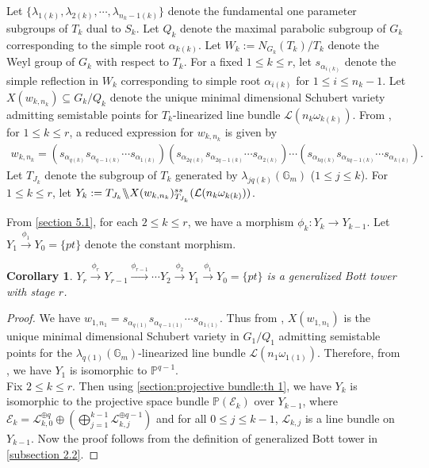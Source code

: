 \documentclass[12pt,reqno]{amsart}
\numberwithin{equation}{section}
\newtheorem{corollary}[theorem]{Corollary}
\theoremstyle{definition}
\newcommand{\GmodX}[3]{#1 \backslash\mkern-6mu\backslash #2^{ss}_{#1}(#3)}
\begin{document}
	Let $\{\lambda_{1(k)},\lambda_{2(k)},\cdots,\lambda_{n_{k}-1(k)}\}$ denote the fundamental one parameter subgroups of $T_{k}$ dual to $S_{k}$. Let $Q_{k}$ denote the maximal parabolic subgroup of $G_{k}$ corresponding to the simple root $\alpha_{k(k)}$. Let $W_{k}:=N_{G_{k}}(T_{k})/T_{k}$ denote the Weyl group of $G_{k}$ with respect to $T_{k}$. For a fixed  $1\leq k\leq r$, let $s_{\alpha_{i(k)}}$ denote the simple reflection in $W_{k}$ corresponding to simple root $\alpha_{i(k)}$ for $1\leq i\leq n_{k}-1$. Let $X(w_{k,n_{k}})\subseteq G_{k}/Q_{k}$ denote the  unique minimal dimensional Schubert variety admitting semistable points for $T_{k}$-linearized line bundle $\mathcal{L}(n_{k}\omega_{k(k)})$. From \cite[Lemma 2.7]{sskannan}, for $1\leq k\leq r$, a reduced expression for $w_{k,n_{k}}$ is given by 
	\begin{align*}
		w_{k,n_{k}}=(s_{\alpha_{q(k)}}s_{\alpha_{q-1(k)}}\cdots s_{\alpha_{1(k)}})(s_{\alpha_{2q(k)}}s_{\alpha_{2q-1(k)}}\cdots s_{\alpha_{2(k)}})\cdots(s_{\alpha_{kq(k)}}s_{\alpha_{kq-1(k)}}\cdots s_{\alpha_{k(k)}}).
	\end{align*}
	Let $T_{J_{k}}$ denote the subgroup of $T_{k}$ generated by $\lambda_{jq(k)}(\mathbb{G}_{m})$ ($1\leq j\leq k$). For $1\leq k\leq r$, let $Y_{k}:=\GmodX{T_{J_{k}}}{X(w_{k,n_{k}})}{\mathcal{L}(n_{k}\omega_{k(k)})}$.
	
	From \cref{section 5.1}, for each $2\leq k\leq r$, we have a morphism  $\phi_{k}: Y_{k}\longrightarrow Y_{k-1}$. Let $Y_{1}\xrightarrow{\text{$\phi_{1}$}}Y_{0}=\{pt\}$ denote the constant morphism.
	
	
	\begin{corollary}\label{section:projective bundle:cor 1} $Y_{r}\xrightarrow{\text{$\phi_{r}$}}Y_{r-1}\xrightarrow{\text{$\phi_{r-1}$}}\cdots Y_{2}\xrightarrow{\text{$\phi_{2}$}}Y_{1}\xrightarrow{\text{$\phi_{1}$}}Y_{0}=\{pt\}$
		is  a generalized Bott tower with stage $r$.
	\end{corollary}
	\begin{proof} 
		We have $w_{1,n_{1}}=s_{\alpha_{q(1)}}s_{\alpha_{q-1(1)}}\cdots s_{\alpha_{1(1)}}$. Thus from \cite[Lemma 5.8]{GKgit}, $X(w_{1,n_{1}})$ is the unique minimal dimensional Schubert variety in $G_{1}/Q_{1}$ admitting semistable points for the $\lambda_{q(1)}(\mathbb{G}_{m})$-linearized line bundle $\mathcal{L}(n_{1}\omega_{1(1)})$. Therefore, from \cite[Theorem 7.1]{GKgit}, we have $Y_{1}$ is isomorphic to $\mathbb{P}^{q-1}$.\\		
		Fix $2\leq k\leq r$. Then using \cref{section:projective bundle:th 1},  we have $Y_{k}$ is isomorphic to the projective space bundle $\mathbb{P}(\mathcal{E}_{k})$ over $Y_{k-1}$, where $\mathcal{E}_{k}=\mathcal{L}_{k,0}^{\oplus q}\oplus(\bigoplus_{j=1}^{k-1}\mathcal{L}^{\oplus q-1}_{k,j})$ and for all $0\leq j\leq k-1$, $\mathcal{L}_{k,j}$ is a line bundle on $Y_{k-1}$. 
		Now the proof follows from the definition of generalized Bott tower in \cref{subsection 2.2}.
	\end{proof}
\end{document}
